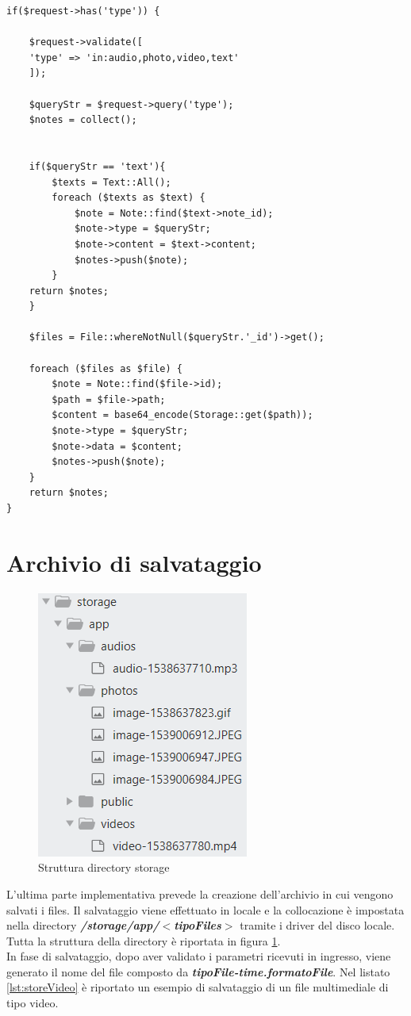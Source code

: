 \begin{lstlisting}[caption={Recupero di un dato tipo di note},label={lst:QueryStringType}]
if($request->has('type')) {
	
	$request->validate([
	'type' => 'in:audio,photo,video,text'
	]);
	
	$queryStr = $request->query('type');
	$notes = collect();
	
	
	if($queryStr == 'text'){
		$texts = Text::All();
		foreach ($texts as $text) {
			$note = Note::find($text->note_id);
			$note->type = $queryStr;
			$note->content = $text->content;
			$notes->push($note);
		}
	return $notes;    
	}
	
	$files = File::whereNotNull($queryStr.'_id')->get();
	
	foreach ($files as $file) {
		$note = Note::find($file->id);
		$path = $file->path;
		$content = base64_encode(Storage::get($path));
		$note->type = $queryStr;
		$note->data = $content;
		$notes->push($note);
	}
	return $notes;
}
\end{lstlisting}

\pagebreak
\section{Archivio di salvataggio}
\begin{figure}[H]
	\centering
	\includegraphics[width=0.3\linewidth, height=0.3\textheight]{StorageDirectory}
	\caption{Struttura directory storage}
	\label{fig:storageDirectory}
\end{figure}

L'ultima parte implementativa prevede la creazione dell'archivio in cui vengono salvati i files. Il salvataggio viene effettuato in locale e la collocazione è impostata nella directory \textit{\textbf{/storage/app/\begin{math}<\end{math}tipoFiles\begin{math}>\end{math}}} tramite i driver del disco locale.
Tutta la struttura della directory è riportata in figura \ref{fig:storageDirectory}. \\
In fase di salvataggio, dopo aver validato i parametri ricevuti in ingresso, viene generato il nome del file composto da \textit{\textbf{tipoFile-time.formatoFile}}.
Nel listato \ref{lst:storeVideo} è riportato un esempio di salvataggio di un file multimediale di tipo video.

